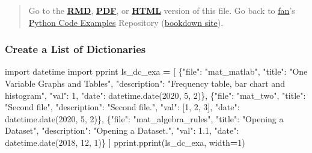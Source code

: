 \documentclass[
]{book}
\newenvironment{Shaded}{\begin{snugshade}}{\end{snugshade}}
\newcommand{\DecValTok}[1]{\textcolor[rgb]{0.00,0.00,0.81}{#1}}
\newcommand{\FloatTok}[1]{\textcolor[rgb]{0.00,0.00,0.81}{#1}}
\newcommand{\ImportTok}[1]{#1}
\newcommand{\NormalTok}[1]{#1}
\newcommand{\OperatorTok}[1]{\textcolor[rgb]{0.81,0.36,0.00}{\textbf{#1}}}
\newcommand{\StringTok}[1]{\textcolor[rgb]{0.31,0.60,0.02}{#1}}
\begin{document}
\begin{quote}
Go to the \href{https://github.com/FanWangEcon//pyfan/blob/master/.//A-Collection-of-Python-Examples.Rmd}{\textbf{RMD}}, \href{https://github.com/FanWangEcon//pyfan/blob/master/.//htmlpdfr/A-Collection-of-Python-Examples.pdf}{\textbf{PDF}}, or \href{https://fanwangecon.github.io//pyfan/.//htmlpdfr/A-Collection-of-Python-Examples.html}{\textbf{HTML}} version of this file. Go back to \href{http://fanwangecon.github.io/}{fan}'s \href{https://fanwangecon.github.io/pyfan/}{Python Code Examples} Repository (\href{https://fanwangecon.github.io/pyfan/bookdown}{bookdown site}).
\end{quote}

\hypertarget{create-a-list-of-dictionaries}{%
\subsubsection{Create a List of Dictionaries}\label{create-a-list-of-dictionaries}}

\begin{Shaded}
\begin{Highlighting}[]
\ImportTok{import}\NormalTok{ datetime}
\ImportTok{import}\NormalTok{ pprint}
\NormalTok{ls_dc_exa }\OperatorTok{=}\NormalTok{  [}
\NormalTok{    \{}\StringTok{"file"}\NormalTok{: }\StringTok{"mat_matlab"}\NormalTok{,}
     \StringTok{"title"}\NormalTok{: }\StringTok{"One Variable Graphs and Tables"}\NormalTok{,}
     \StringTok{"description"}\NormalTok{: }\StringTok{"Frequency table, bar chart and histogram"}\NormalTok{,}
     \StringTok{"val"}\NormalTok{: }\DecValTok{1}\NormalTok{,}
     \StringTok{"date"}\NormalTok{: datetime.date(}\DecValTok{2020}\NormalTok{, }\DecValTok{5}\NormalTok{, }\DecValTok{2}\NormalTok{)\},}
\NormalTok{    \{}\StringTok{"file"}\NormalTok{: }\StringTok{"mat_two"}\NormalTok{,}
     \StringTok{"title"}\NormalTok{: }\StringTok{"Second file"}\NormalTok{,}
     \StringTok{"description"}\NormalTok{: }\StringTok{"Second file."}\NormalTok{,}
     \StringTok{"val"}\NormalTok{: [}\DecValTok{1}\NormalTok{, }\DecValTok{2}\NormalTok{, }\DecValTok{3}\NormalTok{],}
     \StringTok{"date"}\NormalTok{: datetime.date(}\DecValTok{2020}\NormalTok{, }\DecValTok{5}\NormalTok{, }\DecValTok{2}\NormalTok{)\},}
\NormalTok{    \{}\StringTok{"file"}\NormalTok{: }\StringTok{"mat_algebra_rules"}\NormalTok{,}
     \StringTok{"title"}\NormalTok{: }\StringTok{"Opening a Dataset"}\NormalTok{,}
     \StringTok{"description"}\NormalTok{: }\StringTok{"Opening a Dataset."}\NormalTok{,}
     \StringTok{"val"}\NormalTok{: }\FloatTok{1.1}\NormalTok{,}
     \StringTok{"date"}\NormalTok{: datetime.date(}\DecValTok{2018}\NormalTok{, }\DecValTok{12}\NormalTok{, }\DecValTok{1}\NormalTok{)\}}
\NormalTok{]}
\NormalTok{pprint.pprint(ls_dc_exa, width}\OperatorTok{=}\DecValTok{1}\NormalTok{)}
\end{Highlighting}
\end{Shaded}
\end{document}
